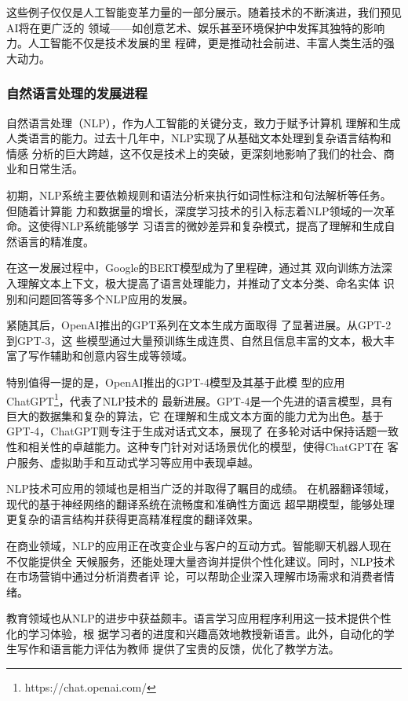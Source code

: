 这些例子仅仅是人工智能变革力量的一部分展示。随着技术的不断演进，我们预见AI将在更广泛的
领域——如创意艺术、娱乐甚至环境保护中发挥其独特的影响力。人工智能不仅是技术发展的里
程碑，更是推动社会前进、丰富人类生活的强大动力。

\subsubsection{自然语言处理的发展进程}

自然语言处理（NLP），作为人工智能的关键分支，致力于赋予计算机
理解和生成人类语言的能力。过去十几年中，NLP实现了从基础文本处理到复杂语言结构和情感
分析的巨大跨越，这不仅是技术上的突破，更深刻地影响了我们的社会、商业和日常生活。

初期，NLP系统主要依赖规则和语法分析来执行如词性标注和句法解析等任务。但随着计算能
力和数据量的增长，深度学习技术的引入标志着NLP领域的一次革命。这使得NLP系统能够学
习语言的微妙差异和复杂模式，提高了理解和生成自然语言的精准度。

在这一发展过程中，Google的BERT\cite{devlin2018bert}模型成为了里程碑，通过其
双向训练方法深入理解文本上下文，极大提高了语言处理能力，并推动了文本分类、命名实体
识别和问题回答等多个NLP应用的发展。

紧随其后，OpenAI推出的GPT系列\cite{radford2018improving}在文本生成方面取得
了显著进展。从GPT-2\cite{radford2019language}到GPT-3\cite{brown2020language}，这
些模型通过大量预训练生成连贯、自然且信息丰富的文本，极大丰富了写作辅助和创意内容生成等领域。

特别值得一提的是，OpenAI推出的GPT-4模型及其基于此模
型的应用ChatGPT\footnote{https://chat.openai.com/}，代表了NLP技术的
最新进展。GPT-4是一个先进的语言模型，具有巨大的数据集和复杂的算法，它
在理解和生成文本方面的能力尤为出色。基于GPT-4，ChatGPT则专注于生成对话式文本，展现了
在多轮对话中保持话题一致性和相关性的卓越能力。这种专门针对对话场景优化的模型，使得ChatGPT在
客户服务、虚拟助手和互动式学习等应用中表现卓越。

NLP技术可应用的领域也是相当广泛的并取得了瞩目的成绩。
在机器翻译领域，现代的基于神经网络的翻译系统在流畅度和准确性方面远
超早期模型，能够处理更复杂的语言结构并获得更高精准程度的翻译效果。

在商业领域，NLP的应用正在改变企业与客户的互动方式。智能聊天机器人现在不仅能提供全
天候服务，还能处理大量咨询并提供个性化建议。同时，NLP技术在市场营销中通过分析消费者评
论，可以帮助企业深入理解市场需求和消费者情绪。

教育领域也从NLP的进步中获益颇丰。语言学习应用程序利用这一技术提供个性化的学习体验，根
据学习者的进度和兴趣高效地教授新语言。此外，自动化的学生写作和语言能力评估为教师
提供了宝贵的反馈，优化了教学方法。

